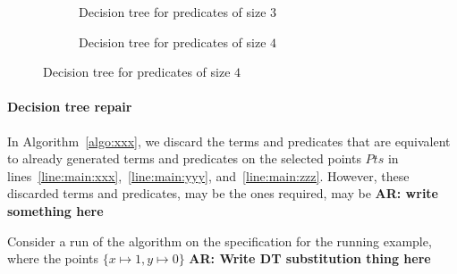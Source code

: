 \documentclass{llncs}
\newcommand\arsays[1]{{\bf AR: #1}}
\newcommand\Points{\mathit{Pts}}
\newcommand\node{v}
\begin{document}
\begin{figure}
  \begin{subfigure}{0.5\textwidth}
    \caption{Decision tree for predicates of size $3$}
    \label{fig:dt:large}
  \end{subfigure}
  \begin{subfigure}{0.5\textwidth}
    \centering
    \caption{Decision tree for predicates of size $4$}
    \label{fig:dt:small}
  \end{subfigure}
\end{figure}

\paragraph{Decision tree repair}
In Algorithm~\ref{algo:xxx}, we discard the terms and predicates that
are equivalent to already generated terms and predicates on the selected
points $\Points$ in lines~\ref{line:main:xxx},~\ref{line:main:yyy},
and~\ref{line:main:zzz}.
However, these discarded terms and predicates, may be the ones required, 
 may be \arsays{write something here} 

\begin{example}
  Consider a run of the algorithm on the specification for the running
  example, where the points $\{ x \mapsto 1, y \mapsto 0 \}$
  \arsays{Write DT substitution thing here}
\end{example}
\end{document}
